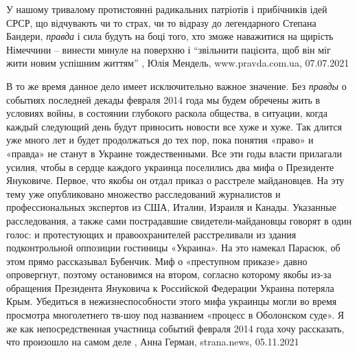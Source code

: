 У нашому тривалому протистоянні радикальних патріотів і прибічників ідей СРСР,
що відчувають чи то страх, чи то відразу до легендарного Степана Бандери,
\emph{правда} і сила будуть на боці того, хто зможе наважитися на щирість
Німеччини – винести минуле на поверхню і \enquote{звільнити пацієнта, щоб він
міг жити новим успішним життям} 
, 
Юлія Мендель, www.pravda.com.ua, 07.07.2021

В то же время данное дело имеет исключительно важное значение. Без
\emph{правды} о событиях последней декады февраля 2014 года мы будем обречены
жить в условиях войны, в состоянии глубокого раскола общества, в ситуации,
когда каждый следующий день будут приносить новости все хуже и хуже. Так длится
уже много лет и будет продолжаться до тех пор, пока понятия «право» и «правда»
не станут в Украине тождественными.  Все эти годы власти прилагали усилия,
чтобы в сердце каждого украинца поселились два мифа о Президенте Януковиче.
Первое, что якобы он отдал приказ о расстреле майдановцев. На эту тему уже
опубликовано множество расследований журналистов и профессиональных экспертов
из США, Италии, Израиля и Канады. Указанные расследования, а также сами
пострадавшие свидетели-майдановцы говорят в один голос: и протестующих и
правоохранителей расстреливали из здания подконтрольной оппозиции гостиницы
«Украина». На это намекал Парасюк, об этом прямо рассказывал Бубенчик.    Миф о
«преступном приказе» давно опровергнут, поэтому остановимся на втором, согласно
которому якобы из-за обращения Президента Януковича к Российской Федерации
Украина потеряла Крым.  Убедиться в нежизнеспособности этого мифа украинцы
могли во время просмотра многолетнего тв-шоу под названием «процесс в
Оболонском суде». Я же как непосредственная участница событий февраля 2014 года
хочу рассказать, что произошло на самом деле
, 
Анна Герман, strana.news, 05.11.2021
